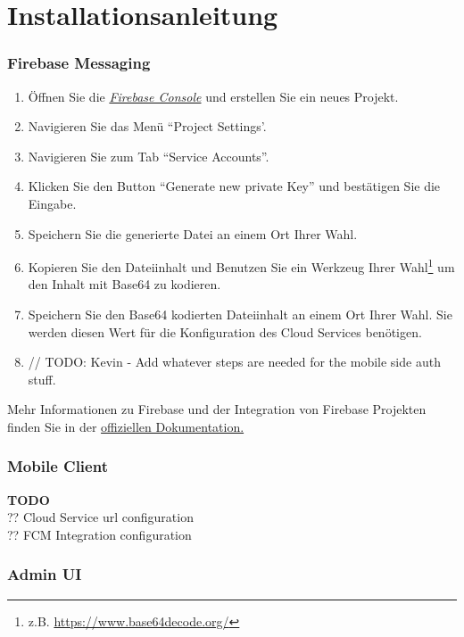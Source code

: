 
\section{Installationsanleitung}

\subsubsection*{Firebase Messaging}
\begin{enumerate}
    \item Öffnen Sie die \href{https://console.firebase.google.com/}{\textit{Firebase Console}} und erstellen Sie ein neues Projekt.
    \item Navigieren Sie das Menü ``Project Settings'.
    \item Navigieren Sie zum Tab ``Service Accounts''.
    \item Klicken Sie den Button ``Generate new private Key'' und bestätigen Sie die Eingabe.
    \item Speichern Sie die generierte Datei an einem Ort Ihrer Wahl.
    \item Kopieren Sie den Dateiinhalt und Benutzen Sie ein Werkzeug Ihrer Wahl\footnote{z.B. \url{https://www.base64decode.org/}} um den Inhalt mit Base64 zu kodieren.
    \item Speichern Sie den Base64 kodierten Dateiinhalt an einem Ort Ihrer Wahl. Sie werden diesen Wert für die Konfiguration des Cloud Services benötigen.
    \item // TODO: Kevin - Add whatever steps are needed for the mobile side auth stuff.
\end{enumerate}

Mehr Informationen zu Firebase und der Integration von Firebase Projekten finden Sie in der \href{https://firebase.google.com/docs/projects/learn-more#setting_up_a_firebase_project_and_registering_apps}{offiziellen Dokumentation.}\cite{understand-firebase}


\subsubsection*{Mobile Client}
\textbf{TODO} \\
?? Cloud Service url configuration \\
?? FCM Integration configuration \\

\subsubsection*{Admin UI}

